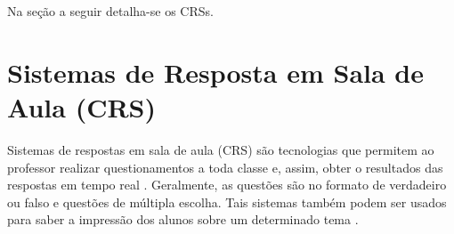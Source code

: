 \begin{figure}
\begin{centering}
    \par
  \end{centering}
\end{figure}

Na seção a seguir detalha-se os CRSs.

\section{Sistemas de Resposta em Sala de Aula (CRS)}
\label{section:sistemas_de_resposta}

Sistemas de respostas em sala de aula (CRS) são tecnologias que permitem ao professor
realizar questionamentos a toda classe e, assim, obter o resultados das respostas
em tempo real \cite{Kay2009}. Geralmente, as questões são no formato de verdadeiro ou
falso e questões de múltipla escolha. Tais sistemas também podem ser usados para
saber a impressão dos alunos sobre um determinado tema \cite{Fies2006}.

